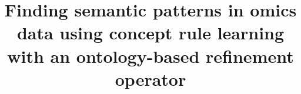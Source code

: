 \documentclass{bmcart}
\begin{document}
\begin{frontmatter}

\begin{fmbox}


\title{Finding semantic patterns in omics data using concept rule learning with an ontology-based refinement operator}


\author[
   addressref={aff1,aff2},                   %
   corref={aff1,aff2},                       %
   email={malinfr1@fel.cvut.cz}   %
]{ }
\author[
   addressref={aff1},
   email={zelezny@fel.cvut.cz}
]{ }
\author[
   addressref={aff1},
   email={klema@fel.cvut.cz}
]{ }



\address[id=aff1]{%
  , %
  ,                     %
  ,                                %
  ,                              %
}
\address[id=aff2]{%
  ,
  ,
}


\end{fmbox}
\end{frontmatter}
\end{document}
